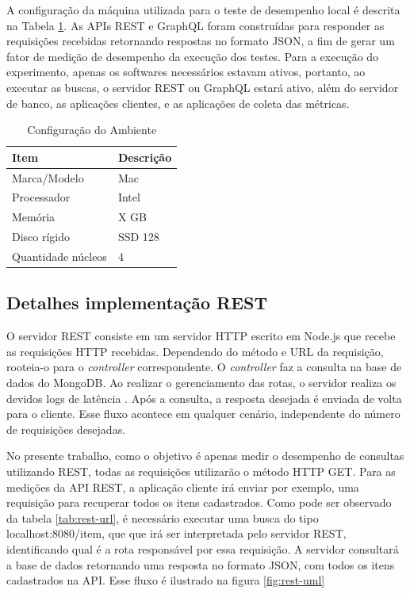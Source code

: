 A configuração da máquina utilizada para o teste de desempenho local é descrita na Tabela \ref{tab:host}. As APIs REST e GraphQL foram construídas para responder as requisições recebidas retornando respostas no formato JSON, a fim de gerar um fator de medição de desempenho da execução dos testes. Para a execução do experimento, apenas os softwares necessários estavam ativos, portanto, ao executar as buscas, o servidor REST ou GraphQL estará ativo, além do servidor de banco, as aplicações clientes, e as aplicações de coleta das métricas.

\begin{table}
    \centering
    \begin{tabular}{| l | l |}
        \hline
        \textbf{Item} & \textbf{Descrição} \\ \hline
        Marca/Modelo & Mac \\ \hline
        Processador & Intel \\ \hline
        Memória &  X GB  \\ \hline
        Disco rígido & SSD 128  \\ \hline
        Quantidade núcleos & 4  \\ \hline
    \end{tabular}
    \caption{Configuração do Ambiente} \label{tab:host}
\end{table}

\subsection{Detalhes implementação REST}

O servidor REST consiste em um servidor HTTP escrito em Node.js que recebe as requisições HTTP recebidas. Dependendo do método e URL da requisição, rooteia-o para o \textit{controller} correspondente. O \textit{controller} faz a consulta na base de dados do MongoDB. Ao realizar o gerenciamento das rotas, o servidor realiza os devidos logs de latência . Após a consulta, a resposta desejada é enviada de volta para o cliente. Esse fluxo acontece em qualquer cenário, independente do número de requisições desejadas.

No presente trabalho, como o objetivo é apenas medir o desempenho de consultas utilizando REST, todas as requisições utilizarão o método HTTP GET. Para as medições da API REST, a aplicação cliente irá enviar por exemplo, uma requisição para recuperar todos os itens cadastrados. Como pode ser observado da tabela \ref{tab:rest-url}, é necessário executar uma busca do tipo localhost:8080/item, que que irá ser interpretada pelo servidor REST, identificando qual é a rota responsável por essa requisição. A servidor consultará a base de dados retornando uma resposta no formato JSON, com todos os itens cadastrados na API. Esse fluxo é ilustrado na figura \ref{fig:rest-uml}

